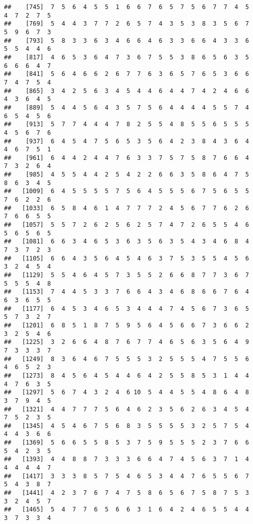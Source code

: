 \documentclass[
]{book}
\begin{document}
\begin{verbatim}
##    [745]  7  5  6  4  5  5  1  6  6  7  6  5  7  5  6  7  7  4  5  4  7  2  7  5
##    [769]  5  4  4  3  7  7  2  6  5  7  4  3  5  3  8  3  5  6  7  5  9  6  7  3
##    [793]  5  8  3  3  6  3  4  6  6  4  6  3  3  6  6  4  3  3  6  5  5  4  4  6
##    [817]  4  6  5  3  6  4  7  3  6  7  5  5  3  8  6  5  6  3  5  6  6  6  4  7
##    [841]  5  6  4  6  6  2  6  7  7  6  3  6  5  7  6  5  3  6  6  7  4  7  5  4
##    [865]  3  4  2  5  6  3  4  5  4  4  6  4  4  7  4  2  4  6  6  4  3  6  4  5
##    [889]  5  4  4  5  6  4  3  5  7  5  6  4  4  4  4  5  5  7  4  6  5  4  5  6
##    [913]  5  7  7  4  4  4  7  8  2  5  5  4  8  5  5  6  5  5  5  4  5  6  7  6
##    [937]  6  4  5  4  7  5  6  5  3  5  6  4  2  3  8  4  3  6  4  4  6  7  5  1
##    [961]  6  4  4  2  4  4  7  6  3  3  7  5  7  5  8  7  6  6  4  7  3  2  6  4
##    [985]  4  5  5  4  4  2  5  4  2  2  6  6  3  5  8  6  4  7  5  8  6  3  4  5
##   [1009]  6  4  5  5  5  5  7  5  6  4  5  5  5  6  7  5  6  5  5  7  6  2  2  6
##   [1033]  6  5  8  4  6  1  4  7  7  7  2  4  5  6  7  7  6  2  6  7  6  6  5  5
##   [1057]  5  5  7  2  6  2  5  6  2  5  7  4  7  2  6  5  5  4  6  5  6  5  6  5
##   [1081]  6  6  3  4  6  5  3  6  3  5  6  3  5  4  3  4  6  8  4  7  3  7  2  3
##   [1105]  6  6  4  3  5  6  4  5  4  6  3  7  5  3  5  5  4  5  6  3  2  4  5  4
##   [1129]  5  5  4  6  4  5  7  3  5  5  2  6  6  8  7  7  3  6  7  5  5  5  4  8
##   [1153]  7  4  4  5  3  3  7  6  6  4  3  4  6  8  6  6  7  6  4  6  3  6  5  5
##   [1177]  6  4  5  3  4  6  5  3  4  4  4  7  4  5  6  7  3  6  5  5  7  3  2  7
##   [1201]  6  8  5  1  8  7  5  9  5  6  4  5  6  6  7  3  6  6  2  3  2  5  4  6
##   [1225]  3  2  6  6  4  8  7  6  7  7  4  6  5  6  3  5  6  4  9  7  3  3  3  7
##   [1249]  8  3  6  4  6  7  5  5  5  3  2  5  5  5  4  7  5  5  6  4  6  5  2  3
##   [1273]  8  4  5  6  4  5  4  4  6  4  2  5  5  8  5  3  1  4  4  4  7  6  3  5
##   [1297]  5  6  7  4  3  2  4  6 10  5  4  4  5  5  4  8  6  4  8  3  7  9  4  5
##   [1321]  4  4  7  7  7  5  6  4  6  2  3  5  6  2  6  3  4  5  4  7  5  2  3  5
##   [1345]  4  5  4  6  7  5  6  8  3  5  5  5  5  3  2  5  7  5  4  4  4  3  6  6
##   [1369]  5  6  6  5  5  8  5  3  7  5  9  5  5  5  2  3  7  6  6  5  4  2  3  5
##   [1393]  4  4  8  8  7  3  3  3  6  6  4  7  4  5  6  3  7  1  4  4  4  4  4  7
##   [1417]  3  3  3  8  5  7  5  4  6  5  3  4  4  7  6  5  5  6  7  5  4  3  8  7
##   [1441]  4  2  3  7  6  7  4  7  5  8  6  5  6  7  5  8  7  5  3  3  2  4  5  7
##   [1465]  5  4  7  7  6  5  6  6  3  1  6  4  2  4  6  5  5  4  4  3  7  3  3  4

\end{verbatim}
\end{document}
